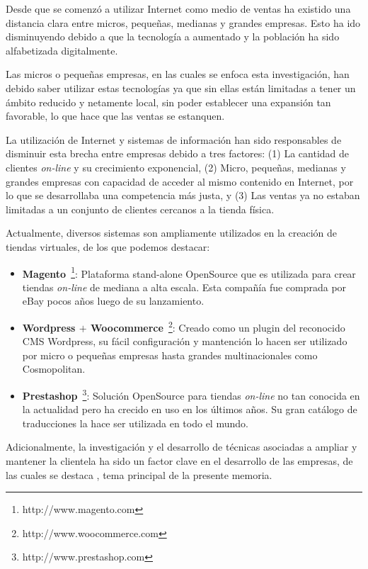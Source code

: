 Desde que se comenzó a utilizar Internet como medio de ventas ha existido una
distancia clara entre micros, pequeñas, medianas y grandes empresas. Esto ha 
ido disminuyendo debido a que la tecnología a aumentado y la población
ha sido alfabetizada digitalmente.

Las micros o pequeñas empresas, en las cuales se enfoca esta investigación, han debido
saber utilizar estas tecnologías ya que sin ellas están limitadas a tener un ámbito reducido
 y netamente local, sin poder establecer una expansión tan favorable, lo que hace que las ventas se estanquen.

La utilización de Internet y sistemas de información han sido responsables de disminuir 
esta brecha entre empresas debido a tres factores: (1) La cantidad de clientes \emph{on-line}
y su crecimiento exponencial, (2) Micro, pequeñas, medianas y grandes empresas con capacidad
de acceder al mismo contenido en Internet, por lo que se desarrollaba una competencia
más justa, y (3) Las ventas ya no estaban limitadas a un conjunto de clientes
cercanos a la tienda física.

Actualmente, diversos sistemas son ampliamente utilizados en la creación
de tiendas virtuales, de los que podemos destacar:

\begin{itemize}
    \item {\bf Magento}~\footnote{http://www.magento.com}:
        Plataforma stand-alone OpenSource que es utilizada para crear tiendas \emph{on-line}
        de mediana a alta escala.
        Esta compañía fue comprada por eBay pocos años luego de su lanzamiento.

    \item {\bf Wordpress $+$ Woocommerce}~\footnote{http://www.woocommerce.com}:
        Creado como un plugin del reconocido CMS Wordpress, su fácil configuración
        y mantención lo hacen ser utilizado por micro o pequeñas empresas hasta
        grandes multinacionales como Cosmopolitan.

    \item {\bf Prestashop}~\footnote{http://www.prestashop.com}:
        Solución OpenSource para tiendas \emph{on-line} no tan conocida en la actualidad
        pero ha crecido en uso en los últimos años.
        Su gran catálogo de traducciones la hace ser utilizada en todo el mundo.

\end{itemize}

Adicionalmente, la investigación y el desarrollo de técnicas asociadas a ampliar
y mantener la clientela ha sido un factor clave en el desarrollo de las empresas,
de las cuales se destaca {\GAM}, tema principal de la presente memoria.

